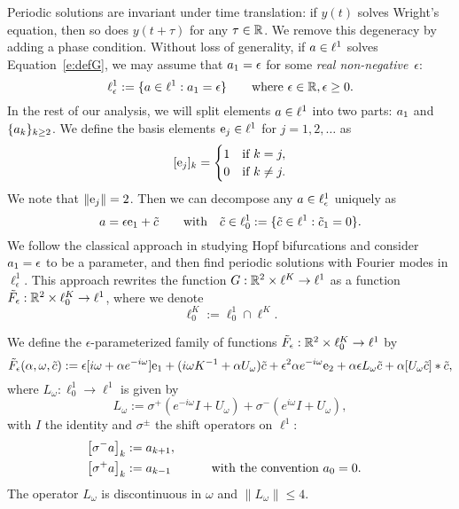 Periodic solutions are invariant under time translation: if $y(t)$ solves Wright's equation, then so does $ y(t+\tau)$ for any $\tau \in \mathbb{R}$. 
We remove this degeneracy by adding a phase condition. 
Without loss of generality, if $a \in \ell^1$ solves Equation~\eqref{e:defG}, we may assume that $a_1 = \epsilon$ for some 
\emph{real non-negative}~$\epsilon$:
\[
  \ell^1_{\epsilon} := \{a \in \ell^1 : a_1 = \epsilon \} 
  \qquad \text{where } \epsilon \in \mathbb{R},  \epsilon \geq 0.
\]
In the rest of our analysis, we will split elements $a \in \ell^1$ into two parts: $a_1$ and $\{a_{k}\}_{k \geq 2}$.  
We define the basis elements $\mathrm{e}_j \in \ell^1$ for $j=1,2,\dots$ as
\[
  [\mathrm{e}_j]_k = \begin{cases}
  1 & \text{if } k=j, \\
  0 & \text{if } k \neq j.
  \end{cases}
\]
We note that $\| \mathrm{e}_j \|=2$. 
Then we can decompose
any $a \in \ell^1_\epsilon$ uniquely as
\begin{equation}\label{e:aepsc}
  a= \epsilon \mathrm{e}_1 + \tilde{c} \qquad \text{with}\quad 
  \tilde{c} \in \ell^1_0 := \{ \tilde{c} \in \ell^1 : \tilde{c}_1 = 0 \}.
\end{equation}
We follow the classical approach in studying Hopf bifurcations and consider 
$a_1 = \epsilon$ to be a parameter, and then find periodic solutions with Fourier modes in $\ell^1_{\epsilon}$.
This approach rewrites the function $G: \mathbb{R}^2 \times \ell^K \to \ell^1$ as a function $\tilde{F}_\epsilon : \mathbb{R}^2 \times \ell^K_0 \to \ell^1$, where 
we denote 
\[
\ell^K_0 := \ell^1_0 \cap \ell^K.
\]
\begin{definition}
We define the $\epsilon$-parameterized family of  functions $\tilde{F}_\epsilon: \mathbb{R}^2 \times \ell^K_0  \to \ell^1$ 
by 
\begin{equation}
\label{eq:fourieroperators}
\tilde{F}_{\epsilon}(\alpha,\omega, \tilde{c}) := 
\epsilon [i \omega + \alpha e^{-i \omega}] \mathrm{e}_1 + 
( i \omega K^{-1} + \alpha U_{\omega}) \tilde{c} + 
\epsilon^2 \alpha e^{-i \omega}  \mathrm{e}_2  +
\alpha \epsilon L_\omega \tilde{c} + 
\alpha  [ U_{\omega} \tilde{c}] * \tilde{c} ,
\end{equation}
where
$L_\omega : \ell^1_0 \to \ell^1$ is given by
\[
   L_{\omega} := \sigma^+( e^{- i \omega} I + U_{\omega}) + \sigma^-(e^{i \omega} I + U_{\omega}),
\]
with $I$ the identity and  $\sigma^\pm$ the shift operators on $\ell^1$:
\begin{alignat*}{2}
\left[ \sigma^- a \right]_k &:=  a_{k+1}  , \\
\left[ \sigma^+ a \right]_k &:=  a_{k-1}  &\qquad&\text{with the convention } a_0=0.
\end{alignat*}
The operator $ L_\omega$ is discontinuous in $\omega$ and $ \| L_\omega \| \leq 4$. 
\end{definition} 

